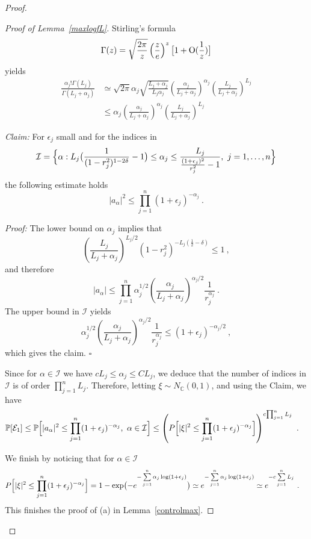 \documentclass[12pt,twoside,final,amsfonts]{amsart}
\theoremstyle{plain}
\theoremstyle{definition}
\theoremstyle{definition}
\begin{document}
\begin{proof}
\begin{proof} [Proof of Lemma~\ref{maxlogfL}]
Stirling's formula 
\begin{equation*}\label{stirling}
 \Gamma(z)=\sqrt{\frac{2\pi}z} \left(\frac ze\right)^z \bigl[1+\textrm O(\frac 1z)\bigr]
\end{equation*}
yields 
\begin{align*}
\frac{\alpha_j!\Gamma(L_j)}{\Gamma(L_j+\alpha_j)}& \simeq \sqrt{2\pi}\alpha_j \sqrt{\frac{L_j+\alpha_j}{L_j \alpha_j}}
 \left(\frac{\alpha_j}{L_j+\alpha_j}\right)^{\alpha_j} \left(\frac{L_j}{L_j+\alpha_j}\right)^{L_j}\\
 &\leq \alpha_j 
 \left(\frac{\alpha_j}{L_j+\alpha_j}\right)^{\alpha_j} \left(\frac{L_j}{L_j+\alpha_j}\right)^{L_j}
\end{align*}

\textit{Claim:} For $\epsilon_j$ small and for the indices in
\[
 \mathcal I=\Bigl\{\alpha : L_j\bigl(\frac 1{(1-r_j^2)^{1-2\delta}}-1\bigr)\leq \alpha_j\leq \frac {L_j}{\frac{(1+\epsilon_j)^2}{r_j^2}-1}, \ j=1,\dots, n\Bigr\}
\]
the following estimate holds
\[
 |a_{\alpha}|^2\leq \prod_{j=1}^n (1+\epsilon_j)^{-\alpha_j}\ .
\]

\textit{Proof:}
The lower bound on $\alpha_j$ implies that
\[
 \left(\frac{L_j}{L_j+\alpha_j}\right)^{L_j/2} (1-r_j^2)^{-L_j (\frac 12-\delta)}\leq 1\ ,
\]
and therefore
\[
  |a_{\alpha}| \leq \prod_{j=1}^n \alpha_j^{1/2} \left(\frac{\alpha_j}{L_j+\alpha_j}\right)^{\alpha_j/2} \frac 1{r_j^{\alpha_j}}\ .
\]
The upper bound in $\mathcal I$ yields
\[
 \alpha_j^{1/2} \left(\frac{\alpha_j}{L_j+\alpha_j}\right)^{\alpha_j/2} \frac 1{r_j^{\alpha_j}} \leq (1+\epsilon_j)^{-\alpha_j/2}\ ,
\]
which gives the claim. $\square$

\medskip

Since for $\alpha\in\mathcal I$ we have $cL_j\leq \alpha_j\leq CL_j$, we deduce that the number of indices in $\mathcal I$ is of order ${\prod_{j=1}^n L_j}$. Therefore, letting $\xi\sim N_{\mathbb{C}}(0,1)$, and using the Claim, we have
\begin{align*}
 \mathbb P[\mathcal E_1]&\leq \mathbb P\Bigl[|a_\alpha|^2\leq \prod_{j=1}^n (1+\epsilon_j)^{-\alpha_j},\ \alpha\in\mathcal I\Bigr]\leq
 \left( P\Bigl[|\xi|^2\leq \prod_{j=1}^n (1+\epsilon_j)^{-\alpha_j}\Bigr] \right)^{c{\prod_{j=1}^n L_j}}\ .
\end{align*}

We finish by noticing that for $\alpha\in\mathcal I$
\begin{align*}
 P\Bigl[|\xi|^2\leq \prod_{j=1}^n (1+\epsilon_j)^{-\alpha_j}\Bigr]&=1-\exp\bigl(-e^{-\sum\limits_{j=1}^n \alpha_j\log(1+\epsilon_j)}\bigr)
 \simeq e^{-\sum\limits_{j=1}^n \alpha_j\log(1+\epsilon_j)}
 \simeq e^{-c\sum\limits_{j=1}^n L_j }\ .
\end{align*}
This finishes the proof of (a) in Lemma~\ref{controlmax}.
\end{proof}


\end{proof}
\end{document}

